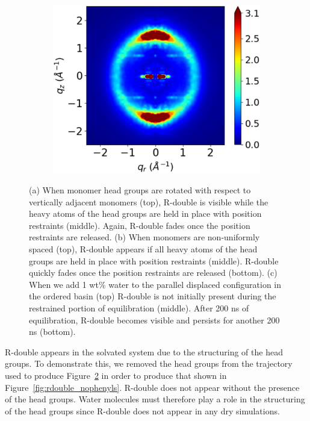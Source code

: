 \documentclass[journal=jpcbfk,manuscript=article]{achemso}
\begin{document}
\begin{figure}[!htb]
\begin{subfigure}{0.3\linewidth}
  	\caption{}\label{fig:staggered_rzplot_norestraints} 
  \end{subfigure}
  \begin{subfigure}{0.3\linewidth}
  	\centering
  	\includegraphics[width=\textwidth]{solvated_offset_rzplot_1.pdf}
  	\caption{}\label{fig:solvated_pore_rzplot_norestraints}
  \end{subfigure}
  \caption{(a) When monomer head groups are rotated with respect to vertically
	  adjacent monomers (top), R-double is visible while the heavy atoms of the head
	  groups are held in place with position restraints (middle). Again, R-double
	  fades once the position restraints are released. (b) When monomers are
	  non-uniformly spaced (top), R-double appears if all heavy atoms of the head
	  groups are held in place with position restraints (middle). R-double quickly
	  fades once the position restraints are released (bottom). (c) When we add 1
	  wt\% water to the parallel displaced configuration in the ordered basin (top)
	  R-double is not initially present during the restrained portion of
	  equilibration (middle).  After 200 ns of equilibration, R-double becomes
	  visible and persists for another 200 ns (bottom).}\label{fig:rdouble}
  \end{figure}

  R-double appears in the solvated system due to the structuring of the head
  groups. To demonstrate this, we removed the head groups from the trajectory
  used to produce Figure~\ref{fig:solvated_pore_rzplot_norestraints} in order to
  produce that shown in Figure~\ref{fig:rdouble_nophenyls}. R-double does not
  appear without the presence of the head groups. Water molecules must therefore play a
  role in the structuring of the head groups since R-double does not appear in
  any dry simulations.
\end{document}
